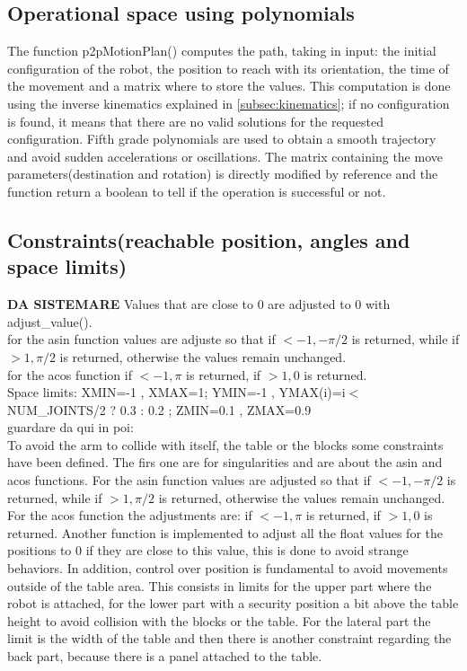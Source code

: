 \documentclass[12pt,a4paper]{article}
\begin{document}
\subsection{Operational space using polynomials}\label{subsec:opspace}
The function p2pMotionPlan() computes the path, taking in input: the initial configuration of the robot, the position to reach with its orientation, the time of the movement and a matrix where to store the values. This computation is done using the inverse kinematics explained in \ref{subsec:kinematics}; if no configuration is found, it means that there are no valid solutions for the requested configuration. Fifth grade polynomials are used to obtain a smooth trajectory and avoid sudden accelerations or oscillations. The matrix containing the move parameters(destination and rotation) is directly modified by reference and the function return a boolean to tell if the operation is successful or not.

\subsection{Constraints(reachable position, angles and space limits)}\label{subsec:constraints}
\textbf{DA SISTEMARE} Values that are close to 0 are adjusted to 0 with adjust\_value().\\
for the asin function values are adjuste so that if $<-1, -\pi/2$ is returned, while if $>1, \pi/2$ is returned, otherwise the values remain unchanged.\\
for the acos function if $<-1, \pi$ is returned, if $>1, 0$ is returned.\\
Space limits: XMIN=-1 , XMAX=1; YMIN=-1 , YMAX(i)=i$<$NUM\_JOINTS/2 ? 0.3 : 0.2 ; ZMIN=0.1 , ZMAX=0.9\\
guardare da qui in poi:\\
To avoid the arm to collide with itself, the table or the blocks some constraints have been defined. The firs one are for singularities and are about the asin and acos functions. For the asin function values are adjusted so that if $<-1, -\pi/2$ is returned, while if $>1, \pi/2$ is returned, otherwise the values remain unchanged. For the acos function the adjustments are: if $<-1, \pi$ is returned, if $>1, 0$ is returned. Another function is implemented to adjust all the float values for the positions to 0 if they are close to this value, this is done to avoid strange behaviors. In addition, control over position is fundamental to avoid movements outside of the table area. This consists in limits for the upper part where the robot is attached, for the lower part with a security position a bit above the table height to avoid collision with the blocks or the table. For the lateral part the limit is the width of the table and then there is another constraint regarding the back part, because there is a panel attached to the table.
\end{document}
